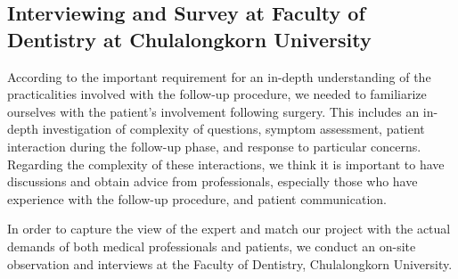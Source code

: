 \documentclass[12pt,oneside,openright,a4paper]{cpe-english-project}
\begin{document}
    \subsection{Interviewing and Survey at Faculty of Dentistry at Chulalongkorn University}
      \qquad According to the important requirement for an in-depth understanding of the practicalities involved with the follow-up procedure, we needed to familiarize ourselves with the patient's involvement following surgery. This includes an in-depth investigation of  complexity of questions, symptom assessment, patient interaction during the follow-up phase, and response to particular concerns. Regarding the complexity of these interactions, we think it is important to have discussions and obtain advice from professionals, especially those who have experience with the follow-up procedure, and patient communication. \par
      \qquad In order to capture the view of the expert and  match our project with the actual demands of both medical professionals and patients, we conduct an on-site observation and interviews at the Faculty of Dentistry, Chulalongkorn University. \par
\end{document}
